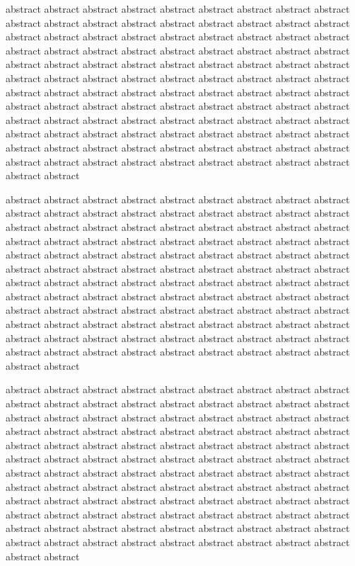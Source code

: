 \documentclass[platex,ja=standard,12pt,a4paper,twoside,onecolumn,fleqn,dvipdfmx,english]{bxjsbook}
\begin{document}
abstract abstract abstract abstract abstract abstract abstract abstract abstract abstract abstract abstract abstract abstract abstract abstract abstract abstract abstract abstract abstract abstract abstract abstract abstract abstract abstract abstract abstract abstract abstract abstract abstract abstract abstract abstract abstract abstract abstract abstract abstract abstract abstract abstract abstract abstract abstract abstract abstract abstract abstract abstract abstract abstract abstract abstract abstract abstract abstract abstract abstract abstract abstract abstract abstract abstract abstract abstract abstract abstract abstract abstract abstract abstract abstract abstract abstract abstract abstract abstract abstract abstract abstract abstract abstract abstract abstract abstract abstract abstract abstract abstract abstract abstract abstract abstract abstract abstract abstract abstract abstract abstract abstract abstract abstract abstract abstract abstract abstract abstract

abstract abstract abstract abstract abstract abstract abstract abstract abstract abstract abstract abstract abstract abstract abstract abstract abstract abstract abstract abstract abstract abstract abstract abstract abstract abstract abstract abstract abstract abstract abstract abstract abstract abstract abstract abstract abstract abstract abstract abstract abstract abstract abstract abstract abstract abstract abstract abstract abstract abstract abstract abstract abstract abstract abstract abstract abstract abstract abstract abstract abstract abstract abstract abstract abstract abstract abstract abstract abstract abstract abstract abstract abstract abstract abstract abstract abstract abstract abstract abstract abstract abstract abstract abstract abstract abstract abstract abstract abstract abstract abstract abstract abstract abstract abstract abstract abstract abstract abstract abstract abstract abstract abstract abstract abstract abstract abstract abstract abstract abstract

abstract abstract abstract abstract abstract abstract abstract abstract abstract abstract abstract abstract abstract abstract abstract abstract abstract abstract abstract abstract abstract abstract abstract abstract abstract abstract abstract abstract abstract abstract abstract abstract abstract abstract abstract abstract abstract abstract abstract abstract abstract abstract abstract abstract abstract abstract abstract abstract abstract abstract abstract abstract abstract abstract abstract abstract abstract abstract abstract abstract abstract abstract abstract abstract abstract abstract abstract abstract abstract abstract abstract abstract abstract abstract abstract abstract abstract abstract abstract abstract abstract abstract abstract abstract abstract abstract abstract abstract abstract abstract abstract abstract abstract abstract abstract abstract abstract abstract abstract abstract abstract abstract abstract abstract abstract abstract abstract abstract abstract abstract
\end{document}
